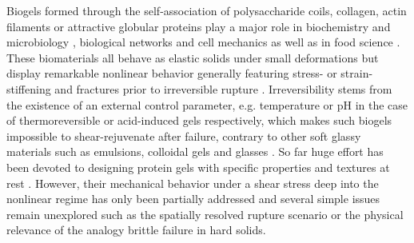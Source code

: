 \documentclass[twocolumn,superscriptaddress,showpacs,preprintnumbers,amsmath,amssymb,prl]{revtex4}
\begin{document}

Biogels formed through the self-association of polysaccharide coils, collagen, actin filaments or attractive globular proteins play a major role in biochemistry and microbiology \cite{Viovy:2000}, biological networks and cell mechanics \cite{Stricker:2010} as well as in food science \cite{Mezzenga:2005}. These biomaterials all behave as elastic solids under small deformations but display remarkable nonlinear behavior generally featuring stress- or strain-stiffening \cite{Gardel:2004} and fractures prior to irreversible rupture \cite{Bonn:1998,Baumberger:2006,Daniels:2007}. Irreversibility stems from the existence of an external control parameter, e.g. temperature or pH in the case of thermoreversible or acid-induced gels respectively, which makes such biogels impossible to shear-rejuvenate after failure, contrary to other soft glassy materials such as emulsions, colloidal gels and glasses \cite{Cloitre:2000,Divoux:2012,Siebenburger:2012}. So far huge effort has been devoted to designing protein gels with specific properties and textures at rest \cite{Dickinson:2006,Gibaud:2012}. However, their mechanical behavior under a shear stress deep into the nonlinear regime has only been partially addressed \cite{Higgs:1990,vanVliet:1995} and several simple issues remain unexplored such as the spatially resolved rupture scenario or the physical relevance of the analogy brittle failure in hard solids.
\end{document}
